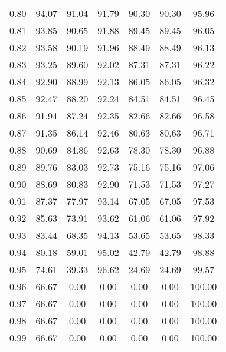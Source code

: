 \begin{tabular}{|c|c|c|c|c|c|c|}
      0.80 &     94.07 &     91.04 &      91.79 &   90.30 &      90.30 &         95.96 \\
      0.81 &     93.85 &     90.65 &      91.88 &   89.45 &      89.45 &         96.05 \\
      0.82 &     93.58 &     90.19 &      91.96 &   88.49 &      88.49 &         96.13 \\
      0.83 &     93.25 &     89.60 &      92.02 &   87.31 &      87.31 &         96.22 \\
      0.84 &     92.90 &     88.99 &      92.13 &   86.05 &      86.05 &         96.32 \\
      0.85 &     92.47 &     88.20 &      92.24 &   84.51 &      84.51 &         96.45 \\
      0.86 &     91.94 &     87.24 &      92.35 &   82.66 &      82.66 &         96.58 \\
      0.87 &     91.35 &     86.14 &      92.46 &   80.63 &      80.63 &         96.71 \\
      0.88 &     90.69 &     84.86 &      92.63 &   78.30 &      78.30 &         96.88 \\
      0.89 &     89.76 &     83.03 &      92.73 &   75.16 &      75.16 &         97.06 \\
      0.90 &     88.69 &     80.83 &      92.90 &   71.53 &      71.53 &         97.27 \\
      0.91 &     87.37 &     77.97 &      93.14 &   67.05 &      67.05 &         97.53 \\
      0.92 &     85.63 &     73.91 &      93.62 &   61.06 &      61.06 &         97.92 \\
      0.93 &     83.44 &     68.35 &      94.13 &   53.65 &      53.65 &         98.33 \\
      0.94 &     80.18 &     59.01 &      95.02 &   42.79 &      42.79 &         98.88 \\
      0.95 &     74.61 &     39.33 &      96.62 &   24.69 &      24.69 &         99.57 \\
      0.96 &     66.67 &      0.00 &       0.00 &    0.00 &       0.00 &        100.00 \\
      0.97 &     66.67 &      0.00 &       0.00 &    0.00 &       0.00 &        100.00 \\
      0.98 &     66.67 &      0.00 &       0.00 &    0.00 &       0.00 &        100.00 \\
      0.99 &     66.67 &      0.00 &       0.00 &    0.00 &       0.00 &        100.00 \\
\bottomrule
\end{tabular}

